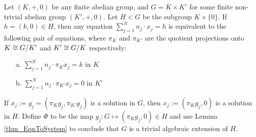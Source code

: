         \begin{example}\label{example_PhaseGroupRel}
                Let $(K,+,0)$ be any finite abelian group, and $G = K \times K'$ for some finite non-trivial abelian group $(K',+,0)$. Let $H<G$ be the subgroup $K \times \{0\}$. If $h = (k,0) \in H$, then any equation $\sum_{j=1}^{N} n_j \cdot x_j = h$ is equivalent to the following pair of equations, where $\pi_{K}$ and $\pi_{K'}$ are the quotient projections onto $K \cong G/K'$ and $K' \cong G/K$ respectively: 
\begin{enumerate}
        \item[a.] $\sum_{j=1}^{N} n_j \cdot \pi_{K}x_j = k$ in $K$
        \item[b.] $\sum_{j=1}^{N} n_j \cdot \pi_{K'}x_j = 0$ in $K'$
\end{enumerate} 
If $x_j := g_j = (\pi_K g_j, \pi_{K'} g_j)$ is a solution in $G$, then $x_j := (\pi_K g_j,0)$ is a solution in $H$. Define $\Phi$ to be the map $g_j:G \mapsto (\pi_K g_j,0) \in H$ and use Lemma \ref{thm_EqnToSystem} to conclude that $G$ is a trivial algebraic extension of $H$. 
        \end{example}

